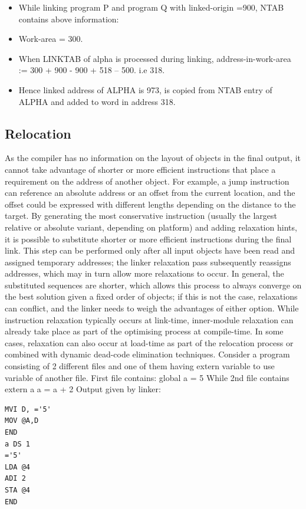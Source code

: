 \documentclass[a4paper,12pt]{extarticle}
\begin{document}
\begin{itemize}
	\item While linking program P and program Q with linked-origin =900, NTAB contains above information:
	\item Work-area = 300.
	\item When LINKTAB of alpha is processed during linking, address-in-work-area := 300 + 900 - 900 + 518 – 500. i.e 318.
	\item Hence linked address of ALPHA is 973, is copied from NTAB entry of ALPHA and added to word in address 318.
\end{itemize}
\subsection{Relocation}
As the compiler has no information on the layout of objects in the final output, it cannot take advantage of shorter or more efficient instructions that place a requirement on the address of another object. For example, a jump instruction can reference an absolute address or an offset from the current location, and the offset could be expressed with different lengths depending on the distance to the target.\newline
By generating the most conservative instruction (usually the largest relative or absolute variant, depending on platform) and adding relaxation hints, it is possible to substitute shorter or more efficient instructions during the final link. This step can be performed only after all input objects have been read and assigned temporary addresses; the linker relaxation pass subsequently reassigns addresses, which may in turn allow more relaxations to occur. In general, the substituted sequences are shorter, which allows this process to always converge on the best solution given a fixed order of objects; if this is not the case, relaxations can conflict, and the linker needs to weigh the advantages of either option.\newline
While instruction relaxation typically occurs at link-time, inner-module relaxation can already take place as part of the optimising process at compile-time. In some cases, relaxation can also occur at load-time as part of the relocation process or combined with dynamic dead-code elimination techniques. Consider a program consisting of 2 different files and one of them having extern variable to use variable of another file.\newline
First file contains:\newline
global a = 5\newline
While 2nd file contains\newline
extern a\newline
a = a + 2\newline
Output given by linker:\newline
\begin{verbatim}
MVI D, ='5'
MOV @A,D
END
a DS 1
='5'
LDA @4
ADI 2
STA @4
END
\end{verbatim}
\end{document}
